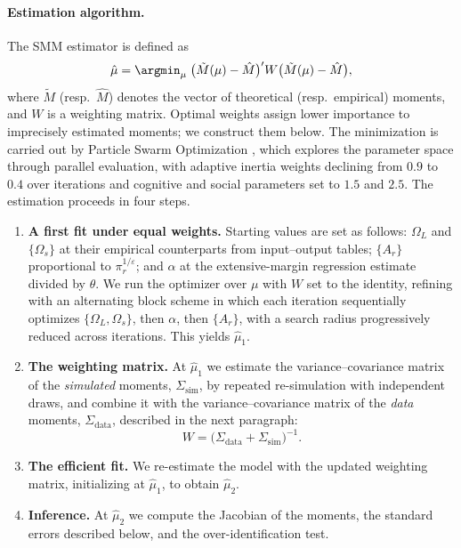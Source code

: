 \paragraph{Estimation algorithm.} The SMM estimator is defined as
\begin{equation}
\hat\mu=\argmin_{\mu}\;\big(\tilde M(\mu)-\hat M\big)'W\big(\tilde M(\mu)-\hat M\big),
\label{eq:app-smm}
\end{equation}
where $\tilde M$ (resp.\ $\hat M$) denotes the vector of theoretical (resp.\ empirical) moments,
and $W$ is a weighting matrix. Optimal weights assign lower importance to imprecisely estimated
moments; we construct them below. The minimization is carried out by Particle Swarm Optimization
\citep{kennedy1995}, which explores the parameter space through parallel evaluation, with
adaptive inertia weights declining from $0.9$ to $0.4$ over iterations and cognitive and social
parameters set to $1.5$ and $2.5$. The estimation proceeds in four steps.

\begin{enumerate}[topsep=3pt,itemsep=3pt,label=\arabic*.]

\item \textbf{A first fit under equal weights.} Starting values are set as follows: $\Omega_{L}$
and $\{\Omega_{s}\}$ at their empirical counterparts from input--output tables; $\{A_{r}\}$
proportional to $\pi_{r}^{1/\varepsilon}$; and $\alpha$ at the extensive-margin regression
estimate divided by $\theta$. We run the optimizer over $\mu$ with $W$ set to the identity,
refining with an alternating block scheme in which each iteration sequentially optimizes
$\{\Omega_{L},\Omega_{s}\}$, then $\alpha$, then $\{A_{r}\}$, with a search radius progressively
reduced across iterations. This yields $\hat\mu_{1}$.

\item \textbf{The weighting matrix.} At $\hat\mu_{1}$ we estimate the variance--covariance matrix
of the \emph{simulated} moments, $\Sigma_{\mathrm{sim}}$, by repeated re-simulation with
independent draws, and combine it with the variance--covariance matrix of the \emph{data}
moments, $\Sigma_{\mathrm{data}}$, described in the next paragraph:
\begin{equation}
W=\big(\Sigma_{\mathrm{data}}+\Sigma_{\mathrm{sim}}\big)^{-1}.
\label{eq:app-W}
\end{equation}

\item \textbf{The efficient fit.} We re-estimate the model with the updated weighting matrix,
initializing at $\hat\mu_{1}$, to obtain $\hat\mu_{2}$.

\item \textbf{Inference.} At $\hat\mu_{2}$ we compute the Jacobian of the moments, the standard
errors described below, and the over-identification test.

\end{enumerate}

